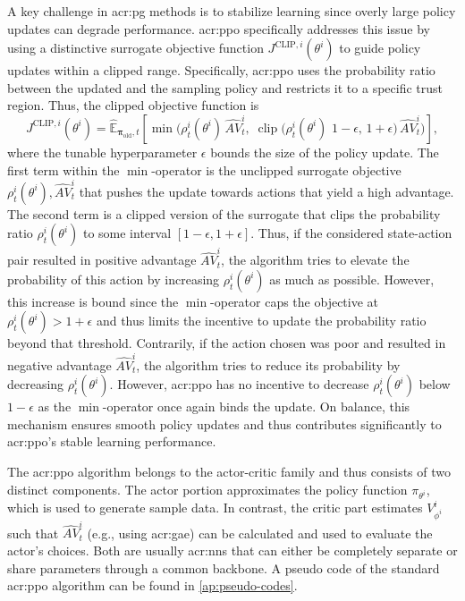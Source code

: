 A key challenge in \gls{acr:pg} methods is to stabilize learning since overly large policy updates can degrade performance. \gls{acr:ppo} \citep{schulman2017} specifically addresses this issue by using a distinctive surrogate objective function $J^{\text{CLIP},i}(\theta^i)$ to guide policy updates within a clipped range. Specifically, \gls{acr:ppo} uses the probability ratio  between the updated and the sampling policy and restricts it to a specific trust region. Thus, the clipped objective function is 
\begin{equation} 
\label{eq:ppo}
    J^{\text{CLIP},i}(\theta^i) = \hat{\mathbb{E}}_{\boldsymbol{\pi}_\mathrm{old}, t}\!\left[ \min\!\Big( \rho^i_t(\theta^i)\, \widehat{AV}^i_t,\; \operatorname{clip}\big( \rho^i_t(\theta^i)\,\, 1-\epsilon,\, 1+\epsilon \big)\, \widehat{AV}^i_t \Big) \right],
\end{equation}
where the tunable hyperparameter $\epsilon$ bounds the size of the policy update. The first term within the $\min$-operator is the unclipped surrogate objective $\rho^i_t(\theta^i),\widehat{AV}^i_t$ that pushes the update towards actions that yield a high advantage. The second term is a clipped version of the surrogate that clips the probability ratio $\rho^i_t(\theta^i)$ to some interval $[1 - \epsilon, 1 + \epsilon]$. Thus, if the considered state-action pair resulted in positive advantage $\widehat{AV}^i_{t}$, the algorithm tries to elevate the probability of this action by increasing $\rho^i_t(\theta^i)$ as much as possible. However, this increase is bound since the $\operatorname{min}$-operator caps the objective at $\rho^i_t(\theta^i) > 1 + \epsilon$ and thus limits the incentive to update the probability ratio beyond that threshold. Contrarily, if the action chosen was poor and resulted in negative advantage $\widehat{AV}^i_{t}$, the algorithm tries to reduce its probability by decreasing $\rho^i_t(\theta^i)$. However, \gls{acr:ppo} has no incentive to decrease $\rho^i_t(\theta^i)$ below $1 - \epsilon$ as the $\operatorname{min}$-operator once again binds the update. On balance, this mechanism ensures smooth policy updates and thus contributes significantly to \gls{acr:ppo}'s stable learning performance.

The \gls{acr:ppo} algorithm belongs to the actor-critic family and thus consists of two distinct components. The actor portion approximates the policy function $\pi_{\theta^i}$, which is used to generate sample data. In contrast, the critic part estimates $V^i_{\phi^i}$ such that $\widehat{AV}^i_t$ (e.g., using \gls{acr:gae}) can be calculated and used to evaluate the actor's choices. Both are usually \glspl{acr:nn} that can either be completely separate or share parameters through a common backbone. A pseudo code of the standard \gls{acr:ppo} algorithm can be found in \autoref{ap:pseudo-codes}.\\



